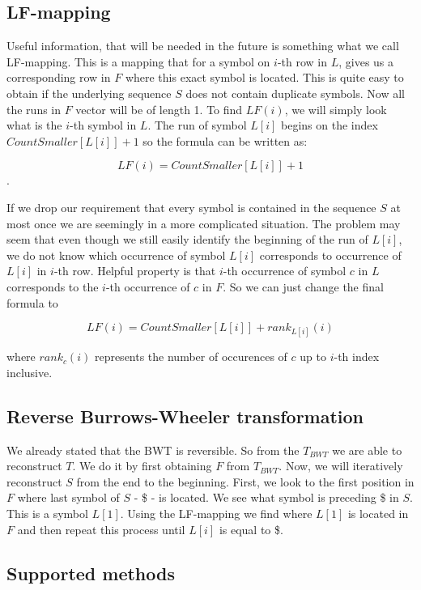 \subsection{LF-mapping}

Useful information, that will be needed in the future is something what we call LF-mapping.
This is a mapping that for a symbol on $i$-th row in $L$, gives us a corresponding row in $F$
where this exact symbol is located. This is quite easy to obtain if the underlying sequence $S$
does not contain duplicate symbols. Now all the runs in $F$ vector will be of length 1.
To find $LF(i)$, we will simply look what is the $i$-th symbol in $L$. The run of
symbol $L[i]$ begins on the index $CountSmaller[L[i]] + 1$ so the formula can be written as:

$$LF(i) = CountSmaller[L[i]] + 1$$.

If we drop our requirement that every symbol is contained in the sequence $S$ at most once
we are seemingly in a more complicated situation. The problem may seem that even
though we still easily identify the beginning of the run of $L[i]$, we do not
know which occurrence of symbol $L[i]$ corresponds to occurrence of $L[i]$ in $i$-th row.
Helpful property is that $i$-th occurrence of symbol $c$ in $L$ corresponds to the
$i$-th occurrence of $c$ in $F$. So we can just change the final formula to

				$$LF(i) = CountSmaller[L[i]] + rank_{L[i]}(i)$$

where $rank_c(i)$ represents the number of occurences of $c$ up to $i$-th index inclusive.

\subsection{Reverse Burrows-Wheeler transformation}

We already stated that the BWT is reversible. So from the $T_{BWT}$ we are able to reconstruct
$T$. We do it by first obtaining $F$ from $T_{BWT}$. Now, we will iteratively reconstruct $S$
from the end to the beginning. First, we look to the first position in $F$ where last symbol
of $S$ - \$ - is located. We see what symbol is preceding \$ in $S$. This is a symbol
$L[1]$. Using the LF-mapping we find where $L[1]$ is located in $F$ and then repeat this process
until $L[i]$ is equal to \$.

\subsection{Supported methods}

